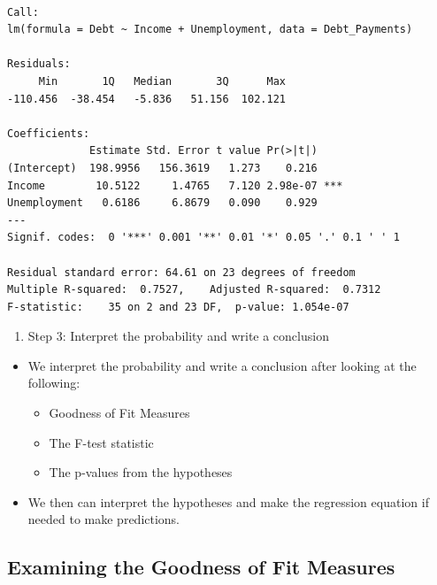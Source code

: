 \documentclass[
  letterpaper,
  DIV=11,
  numbers=noendperiod]{scrreprt}
\providecommand{\tightlist}{%
  \setlength{\itemsep}{0pt}\setlength{\parskip}{0pt}}\usepackage{longtable,booktabs,array}
\begin{document}
\begin{verbatim}

Call:
lm(formula = Debt ~ Income + Unemployment, data = Debt_Payments)

Residuals:
     Min       1Q   Median       3Q      Max 
-110.456  -38.454   -5.836   51.156  102.121 

Coefficients:
             Estimate Std. Error t value Pr(>|t|)    
(Intercept)  198.9956   156.3619   1.273    0.216    
Income        10.5122     1.4765   7.120 2.98e-07 ***
Unemployment   0.6186     6.8679   0.090    0.929    
---
Signif. codes:  0 '***' 0.001 '**' 0.01 '*' 0.05 '.' 0.1 ' ' 1

Residual standard error: 64.61 on 23 degrees of freedom
Multiple R-squared:  0.7527,    Adjusted R-squared:  0.7312 
F-statistic:    35 on 2 and 23 DF,  p-value: 1.054e-07
\end{verbatim}

\begin{enumerate}
\def\labelenumi{\arabic{enumi}.}
\setcounter{enumi}{2}
\tightlist
\item
  Step 3: Interpret the probability and write a conclusion
\end{enumerate}

\begin{itemize}
\tightlist
\item
  We interpret the probability and write a conclusion after looking at
  the following:

  \begin{itemize}
  \tightlist
  \item
    Goodness of Fit Measures
  \item
    The F-test statistic
  \item
    The p-values from the hypotheses
  \end{itemize}
\item
  We then can interpret the hypotheses and make the regression equation
  if needed to make predictions.
\end{itemize}

\subsection{Examining the Goodness of Fit
Measures}\label{examining-the-goodness-of-fit-measures-1}
\end{document}
